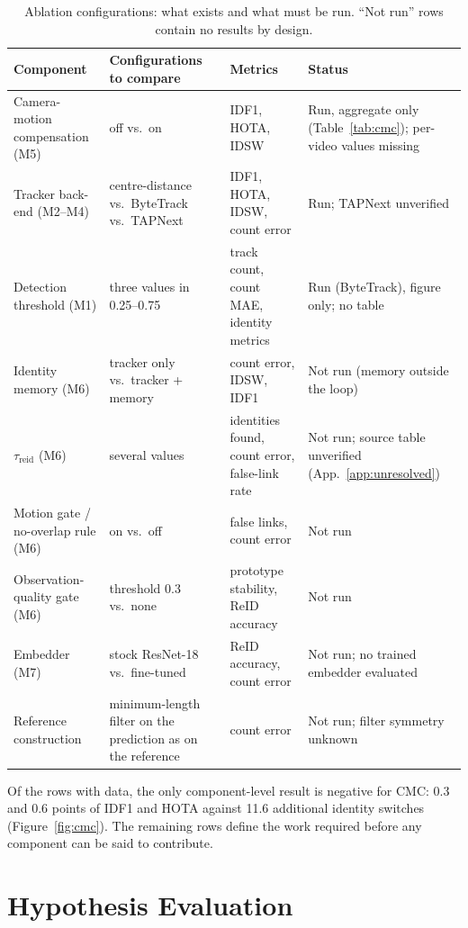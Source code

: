 \documentclass[11pt,a4paper]{article}
\begin{document}
\begin{table}[t]
\caption{Ablation configurations: what exists and what must be run. ``Not run'' rows contain no results by design.}\label{tab:ablation}
\centering\footnotesize
\begin{tabular}{p{3.0cm}p{4.0cm}p{3.1cm}p{3.6cm}}
\toprule
Component & Configurations to compare & Metrics & Status\\
\midrule
Camera-motion compensation (M5) & off vs.\ on & IDF1, HOTA, IDSW & Run, aggregate only (Table~\ref{tab:cmc}); per-video values missing\\
Tracker back-end (M2--M4) & centre-distance vs.\ ByteTrack vs.\ TAPNext & IDF1, HOTA, IDSW, count error & Run; TAPNext unverified\\
Detection threshold (M1) & three values in 0.25--0.75 & track count, count MAE, identity metrics & Run (ByteTrack), figure only; no table\\
Identity memory (M6) & tracker only vs.\ tracker + memory & count error, IDSW, IDF1 & Not run (memory outside the loop)\\
$\tau_{\mathrm{reid}}$ (M6) & several values & identities found, count error, false-link rate & Not run; source table unverified (App.~\ref{app:unresolved})\\
Motion gate / no-overlap rule (M6) & on vs.\ off & false links, count error & Not run\\
Observation-quality gate (M6) & threshold 0.3 vs.\ none & prototype stability, ReID accuracy & Not run\\
Embedder (M7) & stock ResNet-18 vs.\ fine-tuned & ReID accuracy, count error & Not run; no trained embedder evaluated\\
Reference construction & minimum-length filter on the prediction as on the reference & count error & Not run; filter symmetry unknown\\
\bottomrule
\end{tabular}
\end{table}

Of the rows with data, the only component-level result is negative for CMC: 0.3 and 0.6 points of IDF1 and HOTA against 11.6 additional identity switches (Figure~\ref{fig:cmc}). The remaining rows define the work required before any component can be said to contribute.

\section{Hypothesis Evaluation}\label{sec:hyp}
\end{document}
